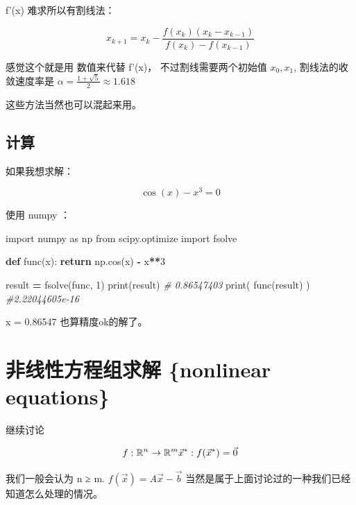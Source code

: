 \documentclass[
]{book}
\newenvironment{Shaded}{\begin{snugshade}}{\end{snugshade}}
\newcommand{\BuiltInTok}[1]{#1}
\newcommand{\CommentTok}[1]{\textcolor[rgb]{0.56,0.35,0.01}{\textit{#1}}}
\newcommand{\ControlFlowTok}[1]{\textcolor[rgb]{0.13,0.29,0.53}{\textbf{#1}}}
\newcommand{\DecValTok}[1]{\textcolor[rgb]{0.00,0.00,0.81}{#1}}
\newcommand{\ImportTok}[1]{#1}
\newcommand{\KeywordTok}[1]{\textcolor[rgb]{0.13,0.29,0.53}{\textbf{#1}}}
\newcommand{\NormalTok}[1]{#1}
\newcommand{\OperatorTok}[1]{\textcolor[rgb]{0.81,0.36,0.00}{\textbf{#1}}}
\begin{document}
f'(x) 难求所以有割线法：

\[
x_{k+1} = x_k - \frac{f(x_k)(x_k - x_{k-1})}{f(x_k) - f(x_{k-1})}
\]

感觉这个就是用 数值来代替 f'(x)， 不过割线需要两个初始值 \(x_0, x_1\), 割线法的收敛速度率是 \({\displaystyle \alpha ={\frac {1+{\sqrt {5}}}{2}}\approx 1.618}\)

这些方法当然也可以混起来用。

\hypertarget{ux8ba1ux7b97-5}{%
\section{计算}\label{ux8ba1ux7b97-5}}

如果我想求解：

\[
\cos(x) - x^3 = 0
\]

使用 numpy ：

\begin{Shaded}
\begin{Highlighting}[]
\ImportTok{import}\NormalTok{ numpy }\ImportTok{as}\NormalTok{ np}
\ImportTok{from}\NormalTok{ scipy.optimize }\ImportTok{import}\NormalTok{ fsolve}

\KeywordTok{def}\NormalTok{ func(x):}
    \ControlFlowTok{return}\NormalTok{ np.cos(x) }\OperatorTok{{-}}\NormalTok{ x}\OperatorTok{**}\DecValTok{3}

\NormalTok{result }\OperatorTok{=}\NormalTok{ fsolve(func, }\DecValTok{1}\NormalTok{)}
\BuiltInTok{print}\NormalTok{(result)}
\CommentTok{\# 0.86547403}
\BuiltInTok{print}\NormalTok{( func(result) )}
\CommentTok{\#2.22044605e{-}16}
\end{Highlighting}
\end{Shaded}

x = 0.86547 也算精度ok的解了。

\hypertarget{ux975eux7ebfux6027ux65b9ux7a0bux7ec4ux6c42ux89e3-nonlinear-equations}{%
\chapter{非线性方程组求解 \{nonlinear equations\}}\label{ux975eux7ebfux6027ux65b9ux7a0bux7ec4ux6c42ux89e3-nonlinear-equations}}

继续讨论

\[
f: \mathbb{R}^n \to \mathbb{R}^m \\
\vec{x}^* :  f(\vec{x}^* ) = \vec{0}
\]

我们一般会认为 n ≥ m. \(f(\vec{x}) = A \vec{x} - \vec{b}\) 当然是属于上面讨论过的一种我们已经知道怎么处理的情况。
\end{document}
